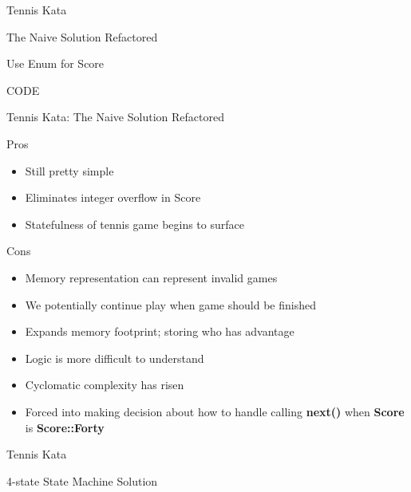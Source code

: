 \documentclass[aspectratio=169]{beamer}
\begin{document}
\begin{frame}{Tennis Kata}
\begin{center}
\begin{Huge}The Naive Solution Refactored\end{Huge}
\linebreak
\begin{Large}
Use Enum for Score
\end{Large}
\end{center}
\end{frame}

\begin{frame}
\begin{center}
\begin{Huge}
CODE
\end{Huge}
\end{center}
\end{frame}

\begin{frame}{Tennis Kata: The Naive Solution Refactored}
\begin{block}{Pros}
\begin{itemize}
\item Still pretty simple
\item Eliminates integer overflow in Score
\item Statefulness of tennis game begins to surface
\end{itemize}
\end{block}
\begin{block}{Cons}
\begin{itemize}
\item Memory representation can represent invalid games
\item We potentially continue play when game should be finished
\item Expands memory footprint; storing who has advantage
\item Logic is more difficult to understand
\item Cyclomatic complexity has risen
\item Forced into making decision about how to handle calling \textbf{next()} when \textbf{Score} is \textbf{Score::Forty}
\end{itemize}
\end{block}
\end{frame}

\begin{frame}{Tennis Kata}
\begin{center}
\begin{Huge}4-state State Machine Solution
\end{Huge}
\end{center}
\end{frame}
\end{document}
